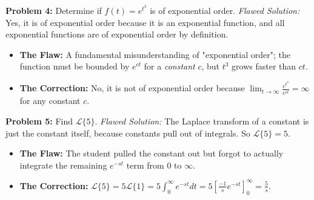 \documentclass[11pt, a4paper]{article}
\theoremstyle{definition}
\theoremstyle{remark}
\begin{document}
\vspace{1em}
\textbf{Problem 4:} Determine if $f(t) = e^{t^3}$ is of exponential order.
\textit{Flawed Solution:}
Yes, it is of exponential order because it is an exponential function, and all exponential functions are of exponential order by definition.
\begin{itemize}
    \item \textbf{The Flaw:} A fundamental misunderstanding of "exponential order"; the function must be bounded by $e^{ct}$ for a \textit{constant} $c$, but $t^3$ grows faster than $ct$.
    \item \textbf{The Correction:} No, it is not of exponential order because $\lim_{t \to \infty} \frac{e^{t^3}}{e^{ct}} = \infty$ for any constant $c$.
\end{itemize}

\vspace{1em}
\textbf{Problem 5:} Find $\mathscr{L}\{5\}$.
\textit{Flawed Solution:}
The Laplace transform of a constant is just the constant itself, because constants pull out of integrals. So $\mathscr{L}\{5\} = 5$.
\begin{itemize}
    \item \textbf{The Flaw:} The student pulled the constant out but forgot to actually integrate the remaining $e^{-st}$ term from $0$ to $\infty$.
    \item \textbf{The Correction:} $\mathscr{L}\{5\} = 5 \mathscr{L}\{1\} = 5 \int_0^\infty e^{-st} dt = 5 \left[ \frac{-1}{s} e^{-st} \right]_0^\infty = \frac{5}{s}$.
\end{itemize}
\end{document}

